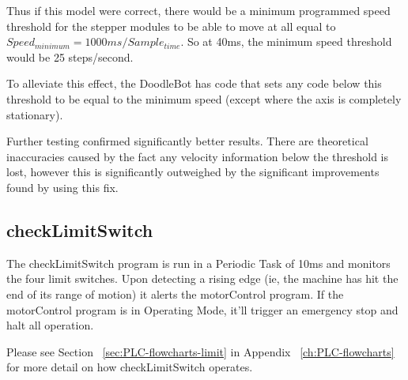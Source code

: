 			Thus if this model were correct, there would be a minimum programmed speed threshold for the stepper modules to be able to move at all equal to $Speed_{minimum} = 1000ms/Sample_{time}$. So at 40ms, the minimum speed threshold would be 25 steps/second.
			
			To alleviate this effect, the DoodleBot has code that sets any code below this threshold to be equal to the minimum speed (except where the axis is completely stationary). 
			
			Further testing confirmed significantly better results. There are theoretical inaccuracies caused by the fact any velocity information below the threshold is lost, however this is significantly outweighed by the significant improvements found by using this fix. 

\subsection{checkLimitSwitch}
	The checkLimitSwitch program is run in a Periodic Task of 10ms and monitors the four limit switches. Upon detecting a rising edge (ie, the machine has hit the end of its range of motion) it alerts the motorControl program. If the motorControl program is in Operating Mode, it'll trigger an emergency stop and halt all operation.
	
	Please see Section ~\ref{sec:PLC-flowcharts-limit} in Appendix ~\ref{ch:PLC-flowcharts} for more detail on how checkLimitSwitch operates.